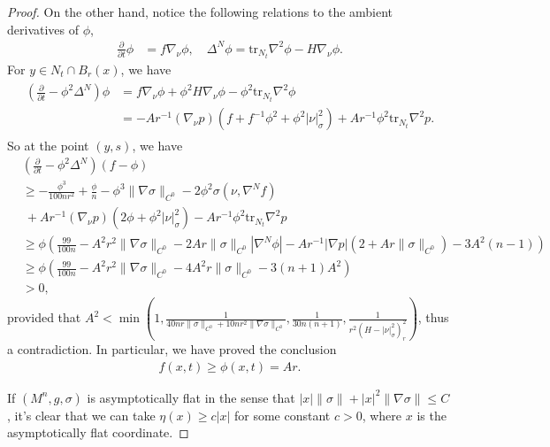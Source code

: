 \documentclass[11pt, letterpaper]{amsart}
\theoremstyle{definition}
\theoremstyle{remark}
\begin{document}
\begin{appendix}
\begin{proof}
	On the other hand, notice the following relations to the ambient derivatives of $\phi $,
	\begin{align*}
		\frac{\partial }{\partial t} \phi &= f \nabla _{\nu } \phi ,\quad \Delta ^{N} \phi = \mathrm{tr}_{N_t} \nabla ^2 \phi - H \nabla _{\nu } \phi .
	\end{align*} 
	For $y \in N_t \cap B_r(x)$, we have
	\begin{align}
		\begin{split}
			\left( \frac{\partial }{\partial t} - \phi  ^2\Delta ^{N} \right) \phi &= f \nabla _{\nu } \phi + \phi ^2H \nabla _{\nu } \phi - \phi  ^2 \mathrm{tr}_{N_t} \nabla ^2 \phi \\
											   &= - A r ^{-1} (\nabla _{\nu } p) \left( f + f ^{-1} \phi ^2 +\phi ^2 |\nu |^2_{\sigma } \right) + A r ^{-1}\phi ^2 \mathrm{tr}_{N_t} \nabla ^2 p.
		\end{split}
	\end{align}
	So at the point $(y,s)$, we have
	\begin{align*}
		&\left( \frac{\partial }{\partial t} - \phi ^2 \Delta ^{N} \right) (f- \phi )\\
		& \geq - \frac{\phi ^3}{100 n r ^2} + \frac{\phi }{n} -  \phi ^3 \|\nabla \sigma \|_{C^0} - 2 \phi  ^2 \sigma (\nu ,\nabla ^{N} f)\\
											    &\ + A r ^{-1} (\nabla _{\nu } p) \left( 2\phi +\phi ^2 |\nu |^2_{\sigma } \right) - A r ^{-1}\phi ^2 \mathrm{tr}_{N_t} \nabla ^2 p\\
											    &\geq \phi \left( \frac{99}{100n} - A^2r ^2 \|\nabla \sigma \|_{C^0} -2A r \|\sigma \|_{C^0} |\nabla ^{N} \phi | - A r ^{-1}|\nabla p| (2+ A r \|\sigma \|_{C^0})- 3A^2(n-1) \right) \\
											    &\geq \phi \left( \frac{99}{100n} - A^2r ^2 \|\nabla \sigma \|_{C^0} - 4A ^2 r\|\sigma \|_{C^0} - 3(n+1)A^2 \right) \\
											    &>0,
	\end{align*} 
	provided that  $A^2 < \min(1, \frac{1}{40 n r\|\sigma \|_{C^0}+ 10 n  r ^2 \|\nabla \sigma \|_{C^0}}, \frac{1}{30n(n+1)}, \frac{1}{r^2(H-|\nu |^2_{\sigma })_r^2})$, thus a contradiction. In particular, we have proved the conclusion
	\begin{align*}
		f(x,t) \geq  \phi (x, t) = A r .
	\end{align*} 

If $(M^n, g , \sigma )$ is asymptotically flat in the sense that $|x| \|\sigma \| + |x|^2 \|\nabla \sigma \| \leq C$, it's clear that we can take $\eta(x) \geq c |x| $ for some constant $c>0$, where $x$ is the asymptotically flat coordinate.
\end{proof}





\end{appendix}
\end{document}
